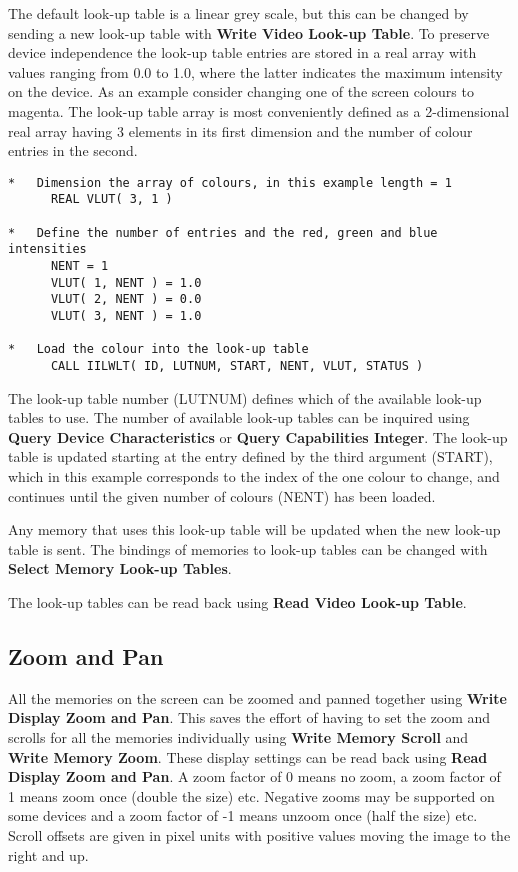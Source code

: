 The default look-up table is a linear grey scale, but this can be changed
by sending a new look-up table with {\bf Write Video Look-up Table}.
To preserve device independence the look-up table entries are stored
in a real array with values ranging from 0.0 to 1.0, where the latter
indicates the maximum intensity on the device. As an example consider
changing one of the screen colours to magenta. The look-up table array
is most conveniently defined as a 2-dimensional real array having 3
elements in its first dimension and the number of colour entries in the
second.
\begin{small}
\begin{verbatim}
*   Dimension the array of colours, in this example length = 1
      REAL VLUT( 3, 1 )

*   Define the number of entries and the red, green and blue intensities
      NENT = 1
      VLUT( 1, NENT ) = 1.0
      VLUT( 2, NENT ) = 0.0
      VLUT( 3, NENT ) = 1.0

*   Load the colour into the look-up table
      CALL IILWLT( ID, LUTNUM, START, NENT, VLUT, STATUS )
\end{verbatim}
\end{small}

The look-up table number (LUTNUM) defines which of the available
look-up tables to use. The number of available look-up tables can be
inquired using {\bf Query Device Characteristics} or {\bf Query
Capabilities Integer}. The look-up table
is updated starting at the entry defined by the third argument
(START), which in this example corresponds to the index of the
one colour to change, and continues until the given number of
colours (NENT) has been loaded.

Any memory that uses this look-up table will be updated when the new
look-up table is sent. The bindings of memories to look-up tables can
be changed with {\bf Select Memory Look-up Tables}.

The look-up tables can be read back using {\bf Read Video Look-up Table}.

\subsection{Zoom and Pan}

All the memories on the screen can be zoomed and panned together using
{\bf Write Display Zoom and Pan}. This saves the effort of having to set
the zoom and scrolls for all the memories individually using {\bf Write
Memory Scroll} and {\bf Write Memory Zoom}. These display settings can be
read back using {\bf Read Display Zoom and Pan}.
A zoom factor of 0 means no zoom, a zoom factor of 1 means zoom once
(double the size) etc. Negative zooms may be supported on some
devices and a zoom factor of -1 means unzoom once (half the size) etc.
Scroll offsets are given in pixel units with positive values moving
the image to the right and up.

